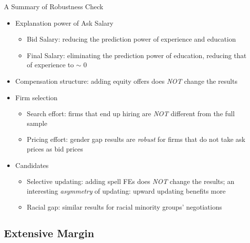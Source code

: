 \begin{frame}{A Summary of Robustness Check}
    \begin{itemize}
        \item<+-> Explanation power of Ask Salary
        \begin{itemize}
            \footnotesize
            \item Bid Salary: reducing the prediction power of experience and education
            \item Final Salary: eliminating the prediction power of education, reducing that of experience to $\sim$ 0
        \end{itemize}
        \item<+-> Compensation structure: adding equity offers does \textcolor{frenchlilac!45!white}{\textit{NOT}} change the results
        \item<+-> Firm selection
        \begin{itemize}
            \footnotesize
            \item Search effort: firms that end up hiring are \textcolor{frenchlilac!45!white}{\textit{NOT}} different from the full sample 
            \item Pricing effort: gender gap results are \textcolor{frenchlilac!45!white}{\textit{robust}} for firms that do not take ask prices as bid prices
        \end{itemize}
        \item<+-> Candidates
        \begin{itemize}
            \footnotesize
            \item Selective updating: adding spell FEs does \textcolor{frenchlilac!45!white}{\textit{NOT}} change the results;  an interesting \textcolor{frenchlilac!45!white}{\textit{asymmetry}} of updating: upward updating benefits more
            \item Racial gap: similar results for racial minority groups' negotiations
        \end{itemize}
    \end{itemize}
\end{frame}

\subsection*{Extensive Margin}

